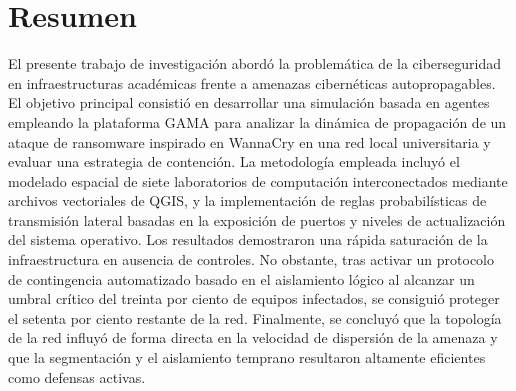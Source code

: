 \section*{Resumen}

El presente trabajo de investigación abordó la problemática de la ciberseguridad en infraestructuras académicas frente a amenazas cibernéticas autopropagables. El objetivo principal consistió en desarrollar una simulación basada en agentes empleando la plataforma GAMA para analizar la dinámica de propagación de un ataque de ransomware inspirado en WannaCry en una red local universitaria y evaluar una estrategia de contención. La metodología empleada incluyó el modelado espacial de siete laboratorios de computación interconectados mediante archivos vectoriales de QGIS, y la implementación de reglas probabilísticas de transmisión lateral basadas en la exposición de puertos y niveles de actualización del sistema operativo. Los resultados demostraron una rápida saturación de la infraestructura en ausencia de controles. No obstante, tras activar un protocolo de contingencia automatizado basado en el aislamiento lógico al alcanzar un umbral crítico del treinta por ciento de equipos infectados, se consiguió proteger el setenta por ciento restante de la red. Finalmente, se concluyó que la topología de la red influyó de forma directa en la velocidad de dispersión de la amenaza y que la segmentación y el aislamiento temprano resultaron altamente eficientes como defensas activas.